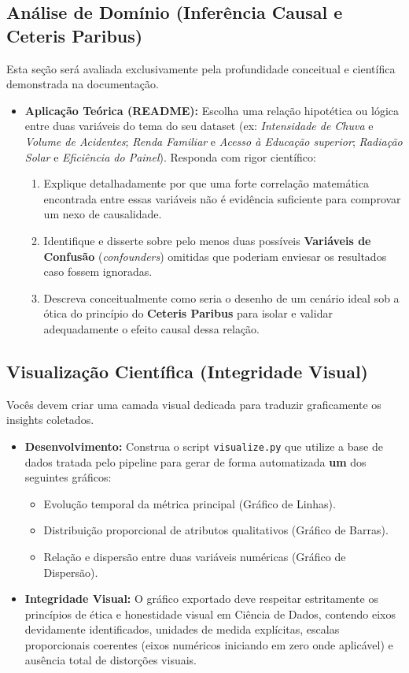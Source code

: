\documentclass[12pt,a4paper]{article}
\begin{document}
	\subsection{Análise de Domínio (Inferência Causal e Ceteris Paribus)}
	Esta seção será avaliada exclusivamente pela profundidade conceitual e científica demonstrada na documentação.
	\begin{itemize}
		\item \textbf{Aplicação Teórica (README):} Escolha uma relação hipotética ou lógica entre duas variáveis do tema do seu dataset (ex: \textit{Intensidade de Chuva} e \textit{Volume de Acidentes}; \textit{Renda Familiar} e \textit{Acesso à Educação superior}; \textit{Radiação Solar} e \textit{Eficiência do Painel}). Responda com rigor científico:
		\begin{enumerate}[label=\alph*)]
			\item Explique detalhadamente por que uma forte correlação matemática encontrada entre essas variáveis não é evidência suficiente para comprovar um nexo de causalidade.
			\item Identifique e disserte sobre pelo menos duas possíveis \textbf{Variáveis de Confusão} (\textit{confounders}) omitidas que poderiam enviesar os resultados caso fossem ignoradas.
			\item Descreva conceitualmente como seria o desenho de um cenário ideal sob a ótica do princípio do \textbf{Ceteris Paribus} para isolar e validar adequadamente o efeito causal dessa relação.
		\end{enumerate}
	\end{itemize}
	
	\subsection{Visualização Científica (Integridade Visual)}
	Vocês devem criar uma camada visual dedicada para traduzir graficamente os insights coletados.
	\begin{itemize}
		\item \textbf{Desenvolvimento:} Construa o script \texttt{visualize.py} que utilize a base de dados tratada pelo pipeline para gerar de forma automatizada \textbf{um} dos seguintes gráficos:
		\begin{itemize}
			\item Evolução temporal da métrica principal (Gráfico de Linhas).
			\item Distribuição proporcional de atributos qualitativos (Gráfico de Barras).
			\item Relação e dispersão entre duas variáveis numéricas (Gráfico de Dispersão).
		\end{itemize}
		\item \textbf{Integridade Visual:} O gráfico exportado deve respeitar estritamente os princípios de ética e honestidade visual em Ciência de Dados, contendo eixos devidamente identificados, unidades de medida explícitas, escalas proporcionais coerentes (eixos numéricos iniciando em zero onde aplicável) e ausência total de distorções visuais.
	\end{itemize}
	
\end{document}
